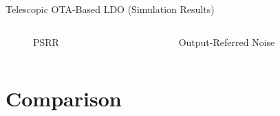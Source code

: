 \documentclass[10pt, aspectratio=169]{beamer}
\newcommand{\svg}[3]{
    \begin{figure}
        \centering
        
        \caption{#2}
    \end{figure}
}
\begin{document}
\begin{frame}{Telescopic OTA-Based LDO (Simulation Results)}
    \begin{columns}[c,onlytextwidth]
        \begin{column}{0.48\textwidth}
            \svg{../simulations/images/tel_psrr.svg}{PSRR}{1}
        \end{column}
        \begin{column}{0.48\textwidth}
            \svg{../simulations/images/tel_noise.svg}{Output-Referred Noise}{1}
        \end{column}
    \end{columns}
\end{frame}

\section{Comparison}
\end{document}

